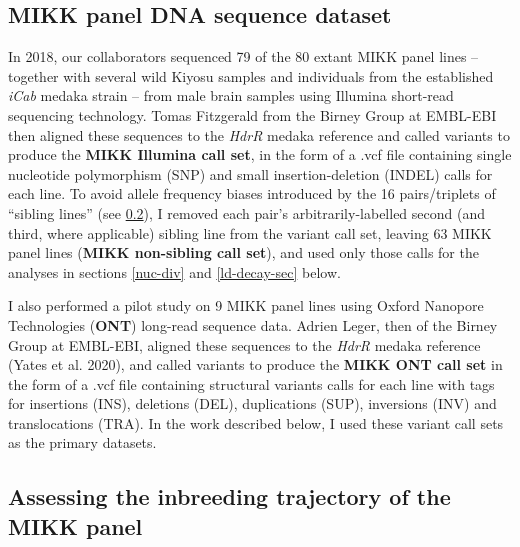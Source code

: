 \documentclass[
]{book}
\begin{document}
\hypertarget{non-sib-calls}{%
\subsection{MIKK panel DNA sequence dataset}\label{non-sib-calls}}

In 2018, our collaborators sequenced 79 of the 80 extant MIKK panel lines -- together with several wild Kiyosu samples and individuals from the established \emph{iCab} medaka strain -- from male brain samples using Illumina short-read sequencing technology. Tomas Fitzgerald from the Birney Group at EMBL-EBI then aligned these sequences to the \emph{HdrR} medaka reference and called variants to produce the \textbf{MIKK Illumina call set}, in the form of a .vcf file containing single nucleotide polymorphism (SNP) and small insertion-deletion (INDEL) calls for each line. To avoid allele frequency biases introduced by the 16 pairs/triplets of ``sibling lines'' (see \ref{inbreeding-sec}), I removed each pair's arbitrarily-labelled second (and third, where applicable) sibling line from the variant call set, leaving 63 MIKK panel lines (\textbf{MIKK non-sibling call set}), and used only those calls for the analyses in sections \ref{nuc-div} and \ref{ld-decay-sec} below.

I also performed a pilot study on 9 MIKK panel lines using Oxford Nanopore Technologies (\textbf{ONT}) long-read sequence data. Adrien Leger, then of the Birney Group at EMBL-EBI, aligned these sequences to the \emph{HdrR} medaka reference (Yates et al. 2020), and called variants to produce the \textbf{MIKK ONT call set} in the form of a .vcf file containing structural variants calls for each line with tags for insertions (INS), deletions (DEL), duplications (SUP), inversions (INV) and translocations (TRA). In the work described below, I used these variant call sets as the primary datasets.

\hypertarget{inbreeding-sec}{%
\subsection{Assessing the inbreeding trajectory of the MIKK panel}\label{inbreeding-sec}}
\end{document}
